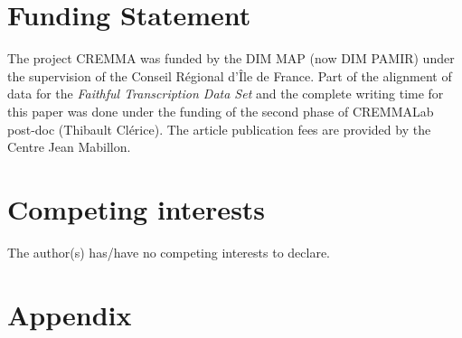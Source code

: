 \documentclass{article}
\begin{document}
\section*{Funding Statement}

The project CREMMA was funded by the DIM MAP (now DIM PAMIR) under the supervision of the Conseil Régional d'Île de France. Part of the alignment of data for the \textit{Faithful Transcription Data Set} and the complete writing time for this paper was done under the funding of the second phase of CREMMALab post-doc (Thibault Clérice). The article publication fees are provided by the Centre Jean Mabillon.

\section*{Competing interests} 

The author(s) has/have no competing interests to declare.




\section*{Appendix}
\end{document}
